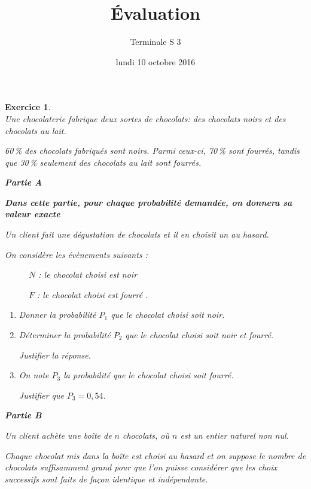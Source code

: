 \documentclass[12pt,a4paper,french]{article}
\title{Évaluation \no{3}}
\author{Terminale S 3}
\date{lundi 10 octobre 2016}
\makeatletter
\renewcommand{\maketitle}%
{\framebox{%
    \begin{minipage}{0.98\linewidth}%
      \begin{center}%
        \Large \@title ~-- \@author \\%
        \@date%
      \end{center}%
  \end{minipage}}%
  \normalsize%
}
\theoremstyle{break}
\theoremstyle{break}
\newtheorem{exercice}{Exercice}
\theoremstyle{nonumberplain}
\makeatother
\begin{document}
\maketitle

\medskip

\begin{exercice}~\\[-5mm]
  Une chocolaterie fabrique deux sortes de chocolats: des chocolats
  noirs et des chocolats au lait.

  60\,\% des chocolats fabriqués sont noirs. Parmi ceux-ci, 70\,\% sont
  fourrés, tandis que 30\,\% seulement
  des chocolats au lait sont fourrés.

  \bigskip

  \textbf{Partie A}

  \medskip

  \textbf{Dans cette partie, pour chaque probabilité demandée, on
  donnera sa valeur exacte}

  \medskip

  Un client fait une dégustation de chocolats et il en choisit un au
  hasard.

  On considère les évènements suivants :
  \setlength\parindent{8mm}
  \begin{description}
    \item[ ]$N$ : \og le chocolat choisi est noir\fg
    \item[ ]$F$ : \og le chocolat choisi est fourré \fg. 
  \end{description}
  \setlength\parindent{0mm}
  \medskip

  \begin{enumerate}
    \item Donner la probabilité $P_1$ que le chocolat choisi soit noir.
    \item Déterminer la probabilité $P_2$ que le chocolat choisi soit
      noir et fourré.

      Justifier la réponse.
    \item On note $P_3$ la probabilité que le chocolat choisi soit
      fourré.

      Justifier que $P_3 = 0,54$.
  \end{enumerate}

  \bigskip

  \textbf{Partie B}

  \medskip

  Un client achète une boîte de $n$ chocolats, où $n$ est un entier
  naturel non nul.

  Chaque chocolat mis dans la boîte est choisi au hasard et on suppose
  le nombre de chocolats suffisamment grand pour que l'on puisse
  considérer que les choix successifs sont faits de façon identique et
  indépendante.


\end{exercice}
\end{document}
